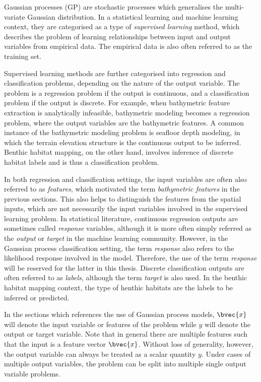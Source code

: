 		Gaussian processes (GP) are stochastic processes which generalises the multi-variate Gaussian distribution. In a statistical learning and machine learning context, they are categorised as a type of \textit{supervised learning} method, which describes the problem of learning relationships between input and output variables from empirical data. The empirical data is also often referred to as the training set.
		
		Supervised learning methods are further categorised into regression and classification problems, depending on the nature of the output variable. The problem is a regression problem if the output is continuous, and a classification problem if the output is discrete. For example, when bathymetric feature extraction is analytically infeasible, bathymetric modeling becomes a regression problem, where the output variables are the bathymetric features. A common instance of the bathymetric modeling problem is seafloor depth modeling, in which the terrain elevation structure is the continuous output to be inferred. Benthic habitat mapping, on the other hand, involves inference of discrete habitat labels and is thus a classification problem.
		
		In both regression and classification settings, the input variables are often also referred to as \textit{features}, which motivated the term \textit{bathymetric features} in the previous sections. This also helps to distinguish the features from the spatial inputs, which are not necessarily the input variables involved in the supervised learning problem. In statistical literature, continuous regression outputs are sometimes called \textit{response} variables, although it is more often simply referred as the \textit{output} or \textit{target} in the machine learning community. However, in the Gaussian process classification setting, the term \textit{response} also refers to the likelihood response involved in the model. Therefore, the use of the term \textit{response} will be reserved for the latter in this thesis. Discrete classification outputs are often referred to as \textit{labels}, although the term \textit{target} is also used. In the benthic habitat mapping context, the type of henthic habitats are the labels to be inferred or predicted. 
		
		In the sections which references the use of Gaussian process models, $\bvec{x}$ will denote the input variable or features of the problem while $y$ will denote the output or target variable. Note that in general there are multiple features such that the input is a feature vector $\bvec{x}$. Without loss of generality, however, the output variable can always be treated as a scalar quantity $y$. Under cases of multiple output variables, the problem can be split into multiple single output variable problems.
		
